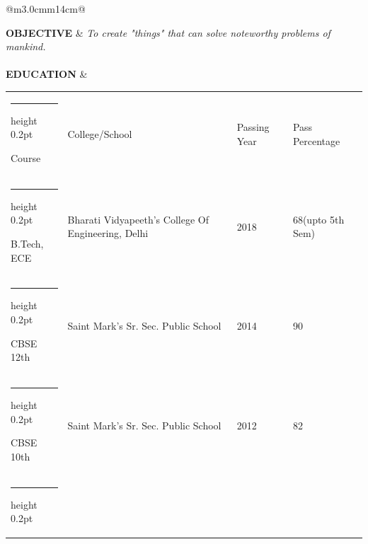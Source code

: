 \documentclass[a4paper]{article}
\makeatletter
\newcommand{\thinhline}
{
	\noalign {\ifnum 0=`}\fi \hrule height 0.2pt
	\futurelet \reserved@a \@xhline
}
\makeatother
\begin{document}
		\begin{longtable}{@{}m{3.0cm}m{14cm}@{}}
		
			\textrm{\textbf {OBJECTIVE}} & \textit{To create "things" that can solve noteworthy problems of mankind.}
			\\ \\
					
		
			\textrm{\textbf {EDUCATION}} & 
				\begin{center}
					\begin{tabular}{ |m{4cm}| m{4cm}| m{2cm}| m{3cm}| }
						\thinhline
						{\begin{center} Course \end{center}} & {\begin{center} 
						College/School \end{center}} & {\begin{center} Passing Year \end{center}} 
						& {\begin{center} Pass Percentage \end{center}} \\
						\thinhline
    					B.Tech,  ECE & Bharati Vidyapeeth's \newline College Of Engineering, Delhi & 2018  & 68(upto 5th Sem)\\ 
		    			\thinhline
    					CBSE 12th & Saint Mark's Sr. Sec. Public School & {2014} & 90\\
    					\thinhline
		    			CBSE 10th & Saint Mark's Sr. Sec. Public School & 2012 & 82\\
    					\thinhline
  					\end{tabular}
				\end{center}
			\\ \\
			

\end{longtable}
\end{document}
